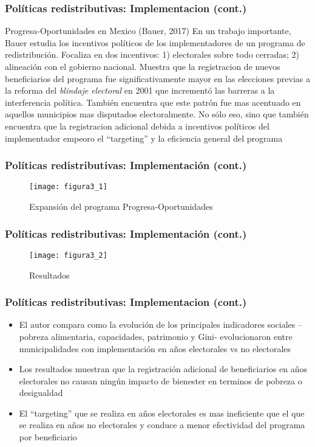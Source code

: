 \documentclass[handout,final,xcolor=dvipsnames]{beamer}
\begin{document}
\begin{frame}\frametitle{Políticas redistributivas: Implementacion (cont.)}
  \begin{block}{Progresa-Oportunidades en Mexico (Bauer, 2017)}
En un trabajo importante, Bauer estudia los incentivos políticos de
los implementadores de un programa de redistribución. Focaliza en dos
incentivos: 1) electorales sobre todo cerradas; 2) alineación con el
gobierno nacional. Muestra que la
registracion de nuevos beneficiarios del programa fue
significativamente mayor en las elecciones previas a la reforma del
\textit{blindaje electoral} en 2001 que incrementó las barreras a la
interferencia política. También encuentra que este patrón fue mas
acentuado en aquellos municipios mas disputados electoralmente. No
sólo eso, sino que también encuentra que la registracion adicional
debida a incentivos políticos del implementador empeoro el
``targeting'' y la eficiencia general del programa
\end{block}
\end{frame}


\begin{frame}\frametitle{Políticas redistributivas: Implementación
    (cont.)}
  \begin{figure}[htbp]
    \centering \vspace{0cm}
    \texttt{[image: figura3\_1]}
    \caption[Modelo de etapas]{Expansión del programa Progresa-Oportunidades}
    \label{fig:figura1}
  \end{figure}
\end{frame}



\begin{frame}\frametitle{Políticas redistributivas: Implementación
    (cont.)}
  \begin{figure}[htbp]
    \centering \vspace{0cm}
    \texttt{[image: figura3\_2]}
    \caption[Modelo de etapas]{Resultados}
    \label{fig:figura1}
  \end{figure}
\end{frame}



\begin{frame}\frametitle{Políticas redistributivas: Implementacion (cont.)}
  \begin{itemize}\itemsep 10pt
  \item El autor compara como la evolución de los principales
    indicadores sociales --pobreza alimentaria, capacidades,
    patrimonio y Gini- evolucionaron entre municipalidades con
    implementación en años electorales vs no electorales
    \item Los resultados muestran que la registración adicional de
      beneficiarios en años electorales no causan ningún impacto de
      bienester en terminos de pobreza o desigualdad
      \item El ``targeting'' que se realiza en años electorales es mas
        ineficiente que el que se realiza en años no electorales y
        conduce a menor efectividad del programa por beneficiario
    \end{itemize}
\end{frame}
\end{document}
